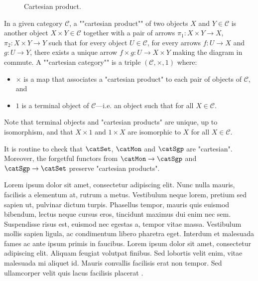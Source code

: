\documentclass{fancy-article}
\begin{document}
\begin{figure}
  \begin{center}
  \caption{\label{fig:cartesian_product}
    Cartesian product.}
  \end{center}
\end{figure}
\AP In a given category $\mathcal{C}$, a ""cartesian product""
of two objects $X$ and $Y \in \mathcal{C}$ is
another object $X\times Y \in \mathcal{C}$ together with a pair of arrows
$\pi_1: X\times Y \to X$, $\pi_2: X\times Y \to Y$ such that for every
object $U\in\mathcal{C}$, for every arrows $f: U \to X$ and $g: U \to Y$,
there exists a unique arrow $f\times g : U \to X\times Y$ making the
diagram in  commute.
A ""cartesian category"" is a triple $(\mathcal{C}, \times, 1)$
where:
\begin{itemize}
  \item $\times$ is a map that associates a "cartesian product" to
  each pair of objects of $\mathcal{C}$, and
  \item $1$ is a terminal object of $\mathcal{C}$---i.e. an object such that
  for all $X\in \mathcal{C}$.
\end{itemize}
Note that terminal objects and "cartesian products" are unique, up to
isomorphism, and that $X \times 1$ and $1\times X$ are isomorphic to $X$
for all $X \in \mathcal{C}$.

\AP It is routine to check that $\catSet$, $\catMon$ and $\catSgp$ are
"cartesian". Moreover, the forgetful functors from $\catMon \to \catSgp$
and $\catSgp \to \catSet$ preserve "cartesian products".


\AP Lorem ipsum dolor sit amet, consectetur adipiscing elit. Nunc nulla mauris, facilisis a elementum at, rutrum a metus. Vestibulum neque lorem, pretium sed sapien ut, pulvinar dictum turpis. Phasellus tempor, mauris quis euismod bibendum, lectus neque cursus eros, tincidunt maximus dui enim nec sem. Suspendisse risus est, euismod nec egestas a, tempor vitae massa. Vestibulum mollis sapien ligula, ac condimentum libero pharetra eget. Interdum et malesuada fames ac ante ipsum primis in faucibus. Lorem ipsum dolor sit amet, consectetur adipiscing elit. Aliquam feugiat volutpat finibus. Sed lobortis velit enim, vitae malesuada mi aliquet id. Mauris convallis facilisis erat non tempor. Sed ullamcorper velit quis lacus facilisis placerat \cite{rosenstein1982linear}.
\end{document}
